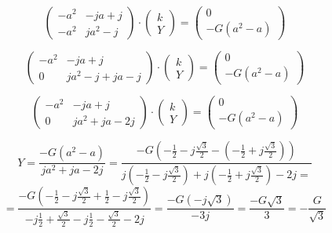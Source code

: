 \documentclass{article}
\begin{document}
$$
    \begin{pmatrix}
        -a^2 & - j a + j \\
        -a^2 & j a^2 - j
    \end{pmatrix}
    \cdot
    \begin{pmatrix}
        k \\
        Y
    \end{pmatrix}
    =
    \begin{pmatrix}
        0 \\
        - G (a^2 - a)
    \end{pmatrix}
$$

$$
    \begin{pmatrix}
        -a^2 & - j a + j           \\
        0    & j a^2 - j + j a - j
    \end{pmatrix}
    \cdot
    \begin{pmatrix}
        k \\
        Y
    \end{pmatrix}
    =
    \begin{pmatrix}
        0 \\
        - G (a^2 - a)
    \end{pmatrix}
$$

$$
    \begin{pmatrix}
        -a^2 & - j a + j         \\
        0    & j a^2 + j a - 2 j
    \end{pmatrix}
    \cdot
    \begin{pmatrix}
        k \\
        Y
    \end{pmatrix}
    =
    \begin{pmatrix}
        0 \\
        - G (a^2 - a)
    \end{pmatrix}
$$

$$
    Y = \frac{- G (a^2 - a)}{j a^2 + j a - 2 j} = \frac{
        - G \left( -\frac{1}{2} - j \frac{\sqrt{3}}{2} - \left( -\frac{1}{2} + j \frac{\sqrt{3}}{2} \right) \right)
    }{
        j \left( -\frac{1}{2} - j \frac{\sqrt{3}}{2} \right) + j \left( -\frac{1}{2} + j \frac{\sqrt{3}}{2} \right) - 2 j =
    }
$$
$$
    = \frac{
        - G \left( -\frac{1}{2} - j \frac{\sqrt{3}}{2} + \frac{1}{2} - j \frac{\sqrt{3}}{2} \right)
    }{
        -j \frac{1}{2} + \frac{\sqrt{3}}{2} - j \frac{1}{2} - \frac{\sqrt{3}}{2} - 2 j
    } = \frac{
        - G \left( -j \sqrt{3} \right)
    }{
        -3 j
    } = \frac{- G \sqrt{3}}{3} = -\frac{G}{\sqrt{3}}
$$
\end{document}
